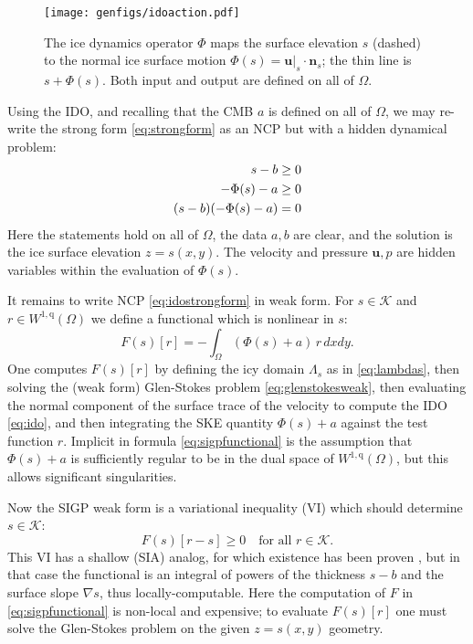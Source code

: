 \documentclass[letterpaper,final,12pt,reqno]{amsart}
\theoremstyle{claim}
\newcommand{\grad}{\nabla}
\newcommand{\bn}{\mathbf{n}}
\newcommand{\bu}{\mathbf{u}}
\newcommand{\qq}{{\text{q}}}
\numberwithin{equation}{section}
\numberwithin{figure}{section}
\numberwithin{table}{section}
\numberwithin{theorem}{section}
\begin{document}
\begin{figure}[t]
\begin{center}
\texttt{[image: genfigs/idoaction.pdf]}
\end{center}
\caption{The ice dynamics operator $\Phi$ maps the surface elevation $s$ (dashed) to the normal ice surface motion $\Phi(s)=\bu|_s \cdot \bn_s$; the thin line is $s+\Phi(s)$.  Both input and output are defined on all of $\Omega$.}
\label{fig:idoaction}
\end{figure}

Using the IDO, and recalling that the CMB $a$ is defined on all of $\Omega$, we may re-write the strong form \eqref{eq:strongform} as an NCP but with a hidden dynamical problem:
\begin{align}
s - b &\ge 0  \label{eq:idostrongform} \\
- \Phi(s) - a &\ge 0 \notag \\
(s - b) (- \Phi(s) - a) &= 0 \notag
\end{align}
Here the statements hold on all of $\Omega$, the data $a,b$ are clear, and the solution is the ice surface elevation $z=s(x,y)$.  The velocity and pressure $\bu,p$ are hidden variables within the evaluation of $\Phi(s)$.

It remains to write NCP \eqref{eq:idostrongform} in weak form.  For $s \in \mathcal{K}$ and $r \in W^{1,\qq}(\Omega)$ we define a functional which is nonlinear in $s$:
\begin{equation}
F(s)[r] = - \int_\Omega (\Phi(s) + a)\, r \,dx dy. \label{eq:sigpfunctional}
\end{equation}
One computes $F(s)[r]$ by defining the icy domain $\Lambda_s$ as in \eqref{eq:lambdas}, then solving the (weak form) Glen-Stokes problem \eqref{eq:glenstokesweak}, then evaluating the normal component of the surface trace of the velocity to compute the IDO \eqref{eq:ido}, and then integrating the SKE quantity $\Phi(s) + a$ against the test function $r$.  Implicit in formula \eqref{eq:sigpfunctional} is the assumption that $\Phi(s) + a$ is sufficiently regular to be in the dual space of $W^{1,\qq}(\Omega)$, but this allows significant singularities.

Now the SIGP weak form is a variational inequality (VI) \cite{KinderlehrerStampacchia1980} which should determine $s\in\mathcal{K}$:
\begin{equation}
F(s)[r - s] \ge 0 \quad \text{for all $r \in \mathcal{K}$.}  \label{eq:sigpweakform}
\end{equation}
This VI has a shallow (SIA) analog, for which existence has been proven \cite{JouvetBueler2012}, but in that case the functional is an integral of powers of the thickness $s-b$ and the surface slope $\grad s$, thus locally-computable.  Here the computation of $F$ in \eqref{eq:sigpfunctional} is non-local and expensive; to evaluate $F(s)[r]$ one must solve the Glen-Stokes problem on the given $z=s(x,y)$ geometry.
\end{document}
